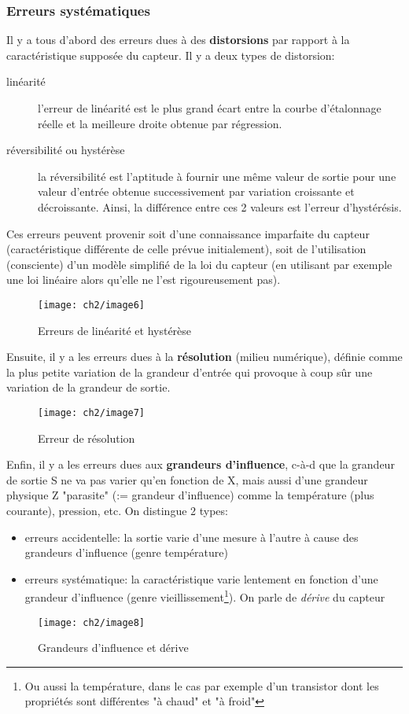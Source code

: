 \subsubsection{Erreurs systématiques}
Il y a tous d'abord des erreurs dues à des \textbf{distorsions} par rapport à la caractéristique supposée du capteur. Il y a deux types de distorsion:
\begin{description}
	\item[linéarité] l'erreur de linéarité est le plus grand écart entre la courbe d'étalonnage réelle et la meilleure droite obtenue par régression.
	\item[réversibilité \textnormal{ou} hystérèse] la réversibilité est l'aptitude à fournir une même valeur de sortie pour une valeur d'entrée obtenue successivement par variation croissante et décroissante. Ainsi, la différence entre ces 2 valeurs est l'erreur d'hystérésis.
\end{description}
Ces erreurs peuvent provenir soit d'une connaissance imparfaite du capteur (caractéristique différente de celle prévue initialement), soit de l'utilisation (consciente) d'un modèle simplifié de la loi du capteur (en utilisant par exemple une loi linéaire alors qu'elle ne l'est rigoureusement pas).
\begin{figure}[H]
	\centering 
	\texttt{[image: ch2/image6]}
	\caption{Erreurs de linéarité et hystérèse}
\end{figure}

Ensuite, il y a les erreurs dues à la \textbf{résolution} (milieu numérique), définie comme la plus petite variation de la grandeur d'entrée qui provoque à coup sûr une variation de la grandeur de sortie.
\begin{figure}[H] 
	\centering 
	\texttt{[image: ch2/image7]}
	\caption{Erreur de résolution}
\end{figure}
Enfin, il y a les erreurs dues aux \textbf{grandeurs d'influence}, c-à-d que la grandeur de sortie S ne va pas varier qu'en fonction de X, mais aussi d'une grandeur physique Z "parasite" (:= grandeur d'influence) comme la température (plus courante), pression, etc. On distingue 2 types:
\begin{itemize}
	\item erreurs accidentelle: la sortie varie d'une mesure à l'autre à cause des grandeurs d'influence (genre température)
	\item erreurs systématique: la caractéristique varie lentement en fonction d'une grandeur d'influence (genre vieillissement\footnote{Ou aussi la température, dans le cas par exemple d'un transistor dont les propriétés sont différentes "à chaud" et "à froid"}). On parle de \emph{dérive} du capteur
\end{itemize}
\begin{figure}[H] 
	\centering 
	\texttt{[image: ch2/image8]}
	\caption{Grandeurs d'influence et dérive}
\end{figure}
